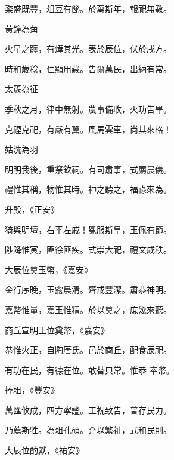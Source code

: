 \begin{pinyinscope}
 粢盛既豐，俎豆有飶。於萬斯年，報祀無斁。



 黃鐘為角



 火星之躔，有燁其光。表於辰位，伏於戌方。



 時和歲稔，仁顯用藏。告爾萬民，出納有常。



 太簇為征



 季秋之月，律中無射。農事備收，火功告畢。



 克禋克祀，有嚴有翼。風馬雲車，尚其來格！



 姑洗為羽



 明明我後，重祭欽祠。有司肅事，式薦晨儀。



 禮惟其稱，物惟其時。神之聽之，福祿來為。



 升殿，《正安》



 猗與明壇，右平左戚！冕服斯皇，玉佩有節。



 陟降惟寅，匪徐匪疾。式崇大祀，禮文咸秩。



 大辰位奠玉幣，《嘉安》



 金行序晚，玉露晨清。齊戒豐潔。肅恭神明。



 嘉幣惟量，嘉玉惟精。於以奠之，庶幾來聽。



 商丘宣明王位奠幣，《嘉安》



 恭惟火正，自陶唐氏。邑於商丘，配食辰祀。



 有功在民，有德在位。敢替典常。惟恭
 奉幣。



 捧俎，《豐安》



 萬匯攸成，四方寧謐。工祝致告，普存民力。



 乃薦斯牲。為俎孔碩。介以繁祉，式和民則。



 大辰位酌獻，《祐安》




\end{pinyinscope}
